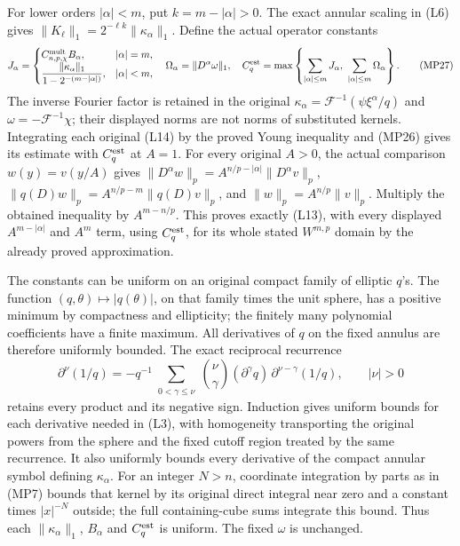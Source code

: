 \documentclass[
  11pt,
]{article}
\begin{document}
For lower orders \(|\alpha|<m\), put \(k=m-|\alpha|>0\). The exact
annular scaling in (L6) gives
\(\|K_\ell\|_1=2^{-\ell k}\|\kappa_\alpha\|_1\). Define the actual
operator constants \[
 J_\alpha=
 \begin{cases}
 C^{\rm mult}_{n,p,\chi}B_\alpha,&|\alpha|=m,\\
 \displaystyle\frac{\|\kappa_\alpha\|_1}{1-2^{-(m-|\alpha|)}},
                                      &|\alpha|<m,
 \end{cases}
 \quad
 \Omega_\alpha=\|D^\alpha\omega\|_1,\quad
 C_q^{\rm est}=
 \max\left\{\sum_{|\alpha|\leq m}J_\alpha,\
            \sum_{|\alpha|\leq m}\Omega_\alpha\right\}.
                                                               \tag{MP27}
\] The inverse Fourier factor is retained in the original
\(\kappa_\alpha=\mathcal F^{-1}(\psi\xi^\alpha/q)\) and
\(\omega=-\mathcal F^{-1}\chi\); their displayed norms are not norms of
substituted kernels. Integrating each original (L14) by the proved Young
inequality and (MP26) gives its estimate with \(C_q^{\rm est}\) at
\(A=1\). For every original \(A>0\), the actual comparison
\(w(y)=v(y/A)\) gives
\(\|D^\alpha w\|_p=A^{n/p-|\alpha|}\|D^\alpha v\|_p\),
\(\|q(D)w\|_p=A^{n/p-m}\|q(D)v\|_p\), and \(\|w\|_p=A^{n/p}\|v\|_p\).
Multiply the obtained inequality by \(A^{m-n/p}\). This proves exactly
(L13), with every displayed \(A^{m-|\alpha|}\) and \(A^m\) term, using
\(C_q^{\rm est}\), for its whole stated \(W^{m,p}\) domain by the
already proved approximation.

The constants can be uniform on an original compact family of elliptic
\(q\)'s. The function \((q,\theta)\mapsto|q(\theta)|\), on that family
times the unit sphere, has a positive minimum by compactness and
ellipticity; the finitely many polynomial coefficients have a finite
maximum. All derivatives of \(q\) on the fixed annulus are therefore
uniformly bounded. The exact reciprocal recurrence \[
 \partial^\nu(1/q)
 =-q^{-1}\sum_{\substack{0<\gamma\leq\nu}}
       \binom{\nu}{\gamma}
       (\partial^\gamma q)\,
       \partial^{\nu-\gamma}(1/q),\qquad |\nu|>0
                                                               \tag{MP28}
\] retains every product and its negative sign. Induction gives uniform
bounds for each derivative needed in (L3), with homogeneity transporting
the original powers from the sphere and the fixed cutoff region treated
by the same recurrence. It also uniformly bounds every derivative of the
compact annular symbol defining \(\kappa_\alpha\). For an integer
\(N>n\), coordinate integration by parts as in (MP7) bounds that kernel
by its original direct integral near zero and a constant times
\(|x|^{-N}\) outside; the full containing-cube sums integrate this
bound. Thus each \(\|\kappa_\alpha\|_1\), \(B_\alpha\) and
\(C_q^{\rm est}\) is uniform. The fixed \(\omega\) is unchanged.
\end{document}
